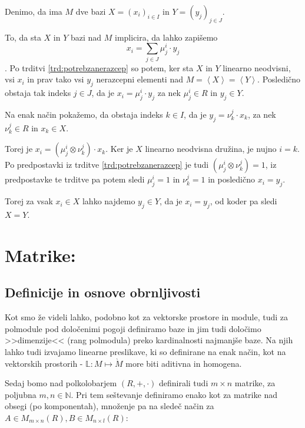 \documentclass[mat1]{fmfdelo}
\newcommand{\N}{\mathbb{N}}
\newcommand{\Gen}[1]{\ensuremath{\left<{#1}\right>}}
\begin{document}
\begin{dokaz}
	Denimo, da ima $M$ dve bazi $X=(x_i)_{i\in I}$ in $Y=(y_j)_{j \in J}$. 
	
	To, da sta $X$ in $Y$ bazi nad $M$ implicira, da lahko zapišemo $$x_i = \sum_{j\in J}\mu_j^i\cdot y_j $$.
	Po trditvi \ref{trd:potrebzanerazcep} so potem, ker sta $X$ in $Y$ linearno neodvisni, vsi $x_i$ in prav tako vsi $y_j$ nerazcepni elementi nad $M = \Gen{X} = \Gen{Y}$. Posledično obstaja tak indeks $j\in J$, da je $x_i = \mu_j^i \cdot y_j$ za nek $\mu_j^i \in R$ in $y_j\in Y$.
	
	Na enak način pokažemo, da obstaja indeks $k\in I$, da je $y_j = \nu_k^j \cdot x_k$, za nek $\nu_k^j \in R$ in $x_k \in X$.

	Torej je $x_i = (\mu_j^i \otimes \nu_k^j) \cdot x_k$. Ker je $X$ linearno neodvisna družina, je nujno $i = k$. Po predpostavki iz trditve \ref{trd:potrebzanerazcep} je tudi $(\mu_j^i \otimes \nu_k^j) = 1$, iz predpostavke te trditve pa potem sledi $\mu_j^i = 1$ in $\nu_k^j = 1$ in posledično $x_i = y_j$.
	
	Torej za vsak $x_i\in X$ lahko najdemo $y_j\in Y$, da je $x_i = y_j$, od koder pa sledi $X = Y$.
\end{dokaz}



\newpage

\section{Matrike:}

\subsection{Definicije in osnove obrnljivosti}

Kot smo že videli lahko, podobno kot za vektorske prostore in module, tudi za polmodule pod določenimi pogoji definiramo baze in jim tudi določimo >>dimenzije<< (rang polmodula) preko kardinalnosti najmanjše baze. Na njih lahko tudi izvajamo linearne preslikave, ki so definirane na enak način, kot na vektorskih prostorih - $\mathbb{L}: M \mapsto \grave{M}$ more biti aditivna in homogena.

Sedaj bomo nad polkolobarjem $(R, +, \cdot)$ definirali tudi $m\times n$ matrike, za poljubna $m,n\in\N$. Pri tem seštevanje definiramo enako kot za matrike nad obsegi (po komponentah), množenje pa na sledeč način za $A\in M_{m\times n}(R), B\in M_{n\times l}(R)$:
\end{document}
